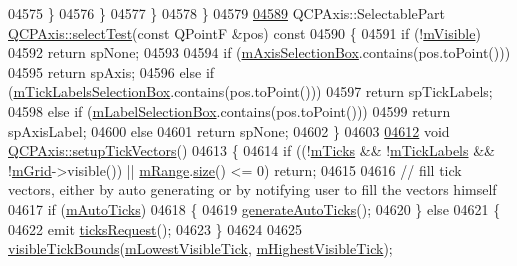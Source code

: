 \begin{DoxyCode}
04575       \}
04576     \}
04577   \}
04578 \}
04579 
\hypertarget{a00115_source_l04589}{}\hyperlink{a00025_a940be5ef61f4fa0dc21e4f4c7a5875c2}{04589} QCPAxis::SelectablePart \hyperlink{a00025_a940be5ef61f4fa0dc21e4f4c7a5875c2}{QCPAxis::selectTest}(\textcolor{keyword}{const} QPointF &pos)\textcolor{keyword}{ const}
04590 \textcolor{keyword}{}\{
04591   \textcolor{keywordflow}{if} (!\hyperlink{a00044_a62e3aed8427d6ce3ccf716f285106cb3}{mVisible})
04592     \textcolor{keywordflow}{return} spNone;
04593   
04594   \textcolor{keywordflow}{if} (\hyperlink{a00025_a6185814615059cacf09fdb74a3e539d7}{mAxisSelectionBox}.contains(pos.toPoint()))
04595     \textcolor{keywordflow}{return} spAxis;
04596   \textcolor{keywordflow}{else} \textcolor{keywordflow}{if} (\hyperlink{a00025_acca7a38191c1f4df06b9416d43172214}{mTickLabelsSelectionBox}.contains(pos.toPoint()))
04597     \textcolor{keywordflow}{return} spTickLabels;
04598   \textcolor{keywordflow}{else} \textcolor{keywordflow}{if} (\hyperlink{a00025_a14fbf65daf2c38cbb0f2c4278a7929dd}{mLabelSelectionBox}.contains(pos.toPoint()))
04599     \textcolor{keywordflow}{return} spAxisLabel;
04600   \textcolor{keywordflow}{else}
04601     \textcolor{keywordflow}{return} spNone;
04602 \}
04603 
\hypertarget{a00115_source_l04612}{}\hyperlink{a00025_a57d9e961bae7d62f5b4e1f143e660c78}{04612} \textcolor{keywordtype}{void} \hyperlink{a00025_a57d9e961bae7d62f5b4e1f143e660c78}{QCPAxis::setupTickVectors}()
04613 \{
04614   \textcolor{keywordflow}{if} ((!\hyperlink{a00025_ab111e74bba22e06848897c932fc549fe}{mTicks} && !\hyperlink{a00025_a3e4315be072026644e69009557a2fa11}{mTickLabels} && !\hyperlink{a00025_a17bffb94aaa40311f259c6ac7bcb5d5f}{mGrid}->visible()) || 
      \hyperlink{a00025_a1ee36773c49062d751560e11f90845f7}{mRange}.\hyperlink{a00049_afa57c13049b965edb6fd1c00ac56338a}{size}() <= 0) \textcolor{keywordflow}{return};
04615   
04616   \textcolor{comment}{// fill tick vectors, either by auto generating or by notifying user to fill the vectors himself}
04617   \textcolor{keywordflow}{if} (\hyperlink{a00025_aac23adcbae246bf165d4539ad65ac9f9}{mAutoTicks})
04618   \{
04619     \hyperlink{a00025_a626eef437c874148df1a5ac78506d463}{generateAutoTicks}();
04620   \} \textcolor{keywordflow}{else}
04621   \{
04622     emit \hyperlink{a00025_af46d99613d29518795134ec4928e3873}{ticksRequest}();
04623   \}
04624   
04625   \hyperlink{a00025_a06320a944d1120732cc0d72fe1306d8b}{visibleTickBounds}(\hyperlink{a00025_aebb24ba8734b7e054efc6e1ecc5414c7}{mLowestVisibleTick}, 
      \hyperlink{a00025_abb3b3ccce7e9779fef2be91ce1a46ef0}{mHighestVisibleTick});

\end{DoxyCode}
